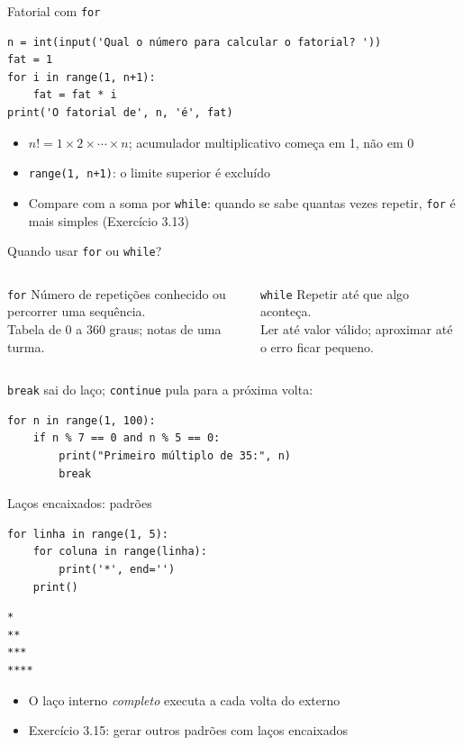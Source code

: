 \documentclass[aspectratio=169,10pt,t]{beamer}
\begin{document}
\begin{frame}[fragile]{Fatorial com \texttt{for}}
\begin{lstlisting}
n = int(input('Qual o número para calcular o fatorial? '))
fat = 1
for i in range(1, n+1):
    fat = fat * i
print('O fatorial de', n, 'é', fat)
\end{lstlisting}
  \begin{itemize}
    \item \(n! = 1\times2\times\cdots\times n\); acumulador multiplicativo começa em \alert{1}, não em 0
    \item \texttt{range(1, n+1)}: o limite superior é excluído
    \item Compare com a soma por \texttt{while}: quando se sabe quantas vezes repetir, \texttt{for} é mais simples (Exercício 3.13)
  \end{itemize}
\end{frame}

\begin{frame}[fragile]{Quando usar \texttt{for} ou \texttt{while}?}
  \begin{columns}[T]
    \begin{block}{\texttt{for}}
      Número de repetições conhecido ou percorrer uma sequência.\\[0.5ex]
      \footnotesize Tabela de 0 a 360 graus; notas de uma turma.
    \end{block}
    \begin{block}{\texttt{while}}
      Repetir até que algo aconteça.\\[0.5ex]
      \footnotesize Ler até valor válido; aproximar até o erro ficar pequeno.
    \end{block}
  \end{columns}
  \vspace{1.5ex}
  \texttt{break} sai do laço; \texttt{continue} pula para a próxima volta:
\begin{lstlisting}
for n in range(1, 100):
    if n % 7 == 0 and n % 5 == 0:
        print("Primeiro múltiplo de 35:", n)
        break
\end{lstlisting}
\end{frame}

\begin{frame}[fragile]{Laços encaixados: padrões}
\begin{lstlisting}
for linha in range(1, 5):
    for coluna in range(linha):
        print('*', end='')
    print()
\end{lstlisting}
\begin{lstlisting}[style=saida]
*
**
***
****
\end{lstlisting}
  \begin{itemize}
    \item O laço interno \emph{completo} executa a cada volta do externo
    \item Exercício 3.15: gerar outros padrões com laços encaixados
  \end{itemize}
\end{frame}
\end{document}
